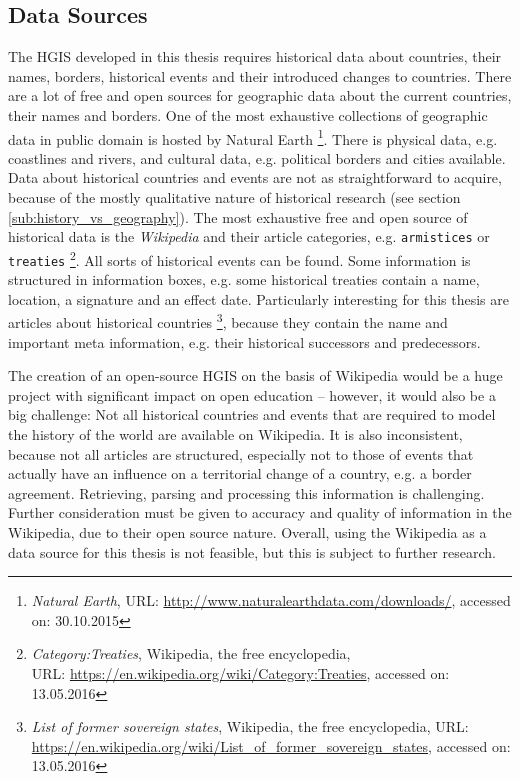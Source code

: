 
\subsection{Data Sources} %
\label{sub:data_sources}

The HGIS developed in this thesis requires historical data about countries, their names, borders, historical events and their introduced changes to countries. There are a lot of free and open sources for geographic data about the current countries, their names and borders. One of the most exhaustive collections of geographic data in public domain is hosted by Natural Earth
\footnote{
  \textit{Natural Earth},
  URL: \url{http://www.naturalearthdata.com/downloads/},
  accessed on: 30.10.2015
}.
There is physical data, e.g. coastlines and rivers, and cultural data, e.g. political borders and cities available.
Data about historical countries and events are not as straightforward to acquire, because of the mostly qualitative nature of historical research (see section \ref{sub:history_vs_geography}). The most exhaustive free and open source of historical data is the \emph{Wikipedia} and their article categories, e.g. \texttt{armistices} or \texttt{treaties}
\footnote{
  \textit{Category:Treaties},
  Wikipedia, the free encyclopedia,\\
  URL: \url{https://en.wikipedia.org/wiki/Category:Treaties},
  accessed on: 13.05.2016
}.
All sorts of historical events can be found. Some information is structured in information boxes, e.g. some historical treaties contain a name, location, a signature and an effect date. Particularly interesting for this thesis are articles about historical countries
\footnote{
  \textit{List of former sovereign states},
  Wikipedia, the free encyclopedia,
  URL: \url{https://en.wikipedia.org/wiki/List_of_former_sovereign_states},
  accessed on: 13.05.2016
},
because they contain the name and important meta information, e.g. their historical successors and predecessors.

The creation of an open-source HGIS on the basis of Wikipedia would be a huge project with significant impact on open education -- however, it would also be a big challenge: Not all historical countries and events that are required to model the history of the world are available on Wikipedia. It is also inconsistent, because not all articles are structured, especially not to those of events that actually have an influence on a territorial change of a country, e.g. a border agreement. Retrieving, parsing and processing this information is challenging.
Further consideration must be given to accuracy and quality of information in the Wikipedia, due to their open source nature.
Overall, using the Wikipedia as a data source for this thesis is not feasible, but this is subject to further research.

